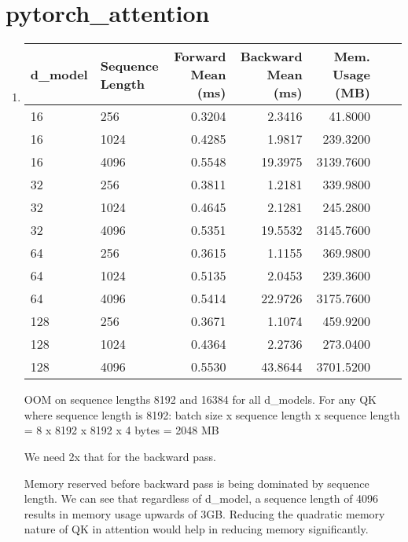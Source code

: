 \documentclass{article}
\begin{document}
\section{pytorch\_attention}
\begin{enumerate}
\item
\begin{table}[h!]
\centering
\label{tab:benchmark}
\begin{tabular}{llrrrrr}
\toprule
d\_model & Sequence Length & Forward Mean (ms) & Backward Mean (ms) & Mem. Usage (MB) \\
\midrule
16 & 256 & 0.3204 & 2.3416 & 41.8000 \\
16 & 1024 & 0.4285 & 1.9817 & 239.3200 \\
16 & 4096 & 0.5548 & 19.3975 & 3139.7600 \\
32 & 256 & 0.3811 & 1.2181 & 339.9800 \\
32 & 1024 & 0.4645 & 2.1281 & 245.2800 \\
32 & 4096 & 0.5351 & 19.5532 & 3145.7600 \\
64 & 256 & 0.3615 & 1.1155 & 369.9800 \\
64 & 1024 & 0.5135 & 2.0453 & 239.3600 \\
64 & 4096 & 0.5414 & 22.9726 & 3175.7600 \\
128 & 256 & 0.3671 & 1.1074 & 459.9200 \\
128 & 1024 & 0.4364 & 2.2736 & 273.0400 \\
128 & 4096 & 0.5530 & 43.8644 & 3701.5200 \\
\bottomrule
\end{tabular}
\end{table}
OOM on sequence lengths 8192 and 16384 for all d\_models.
For any QK where sequence length is 8192:
  batch size x sequence length x sequence length = 8 x 8192 x 8192 x 4 bytes = 2048 MB

We need 2x that for the backward pass.

Memory reserved before backward pass is being dominated by sequence length. We can see that regardless of d\_model, a sequence length of 4096 results in memory usage upwards of 3GB. Reducing the quadratic memory nature of QK in attention would help in reducing memory significantly.

\end{enumerate}
\end{document}
